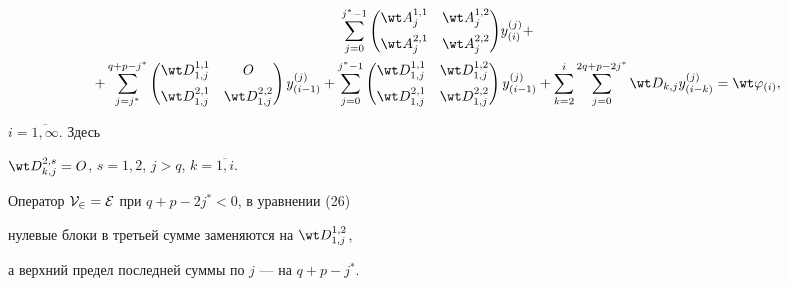\begin{pf}
\begin{gather}
\sum_{j=0}^{j^*-1}{


{\begin{pmatrix}


 \wt A_j^{1,1} & \wt A_j^{1,2} \\[2mm]


 \wt A_j^{2,1} & \wt A_j^{2,2} 


\end{pmatrix} }


y_{(i)}^{(j)}}+ \notag \\


%


+ \sum_{j=j^*}^{q+p-j^*}{


\begin{pmatrix}


 \wt D_{1,j}^{1,1} & O \\[2mm]


 \wt D_{1,j}^{2,1} & \wt D_{1,j}^{2,2}


\end{pmatrix}


y_{(i-1)}^{(j)}}+


 \sum_{j=0}^{j^*-1}{


\begin{pmatrix}


 \wt D_{1,j}^{1,1} & \wt D_{1,j}^{1,2} \\[2mm]


 \wt D_{1,j}^{2,1} & \wt D_{1,j}^{2,2}


\end{pmatrix}


y_{(i-1)}^{(j)}}+


\sum_{k=2}^{i}{


\sum_{j=0}^{2q+p-2j^*}{


\wt D_{k,j}


y_{(i-k)}^{(j)}}}=\wt \varphi_{(i)}, 


\end{gather}


$i=\overline{1, \infty }$. Здесь


$\wt D_{k,j}^{2,s}=O$, $s=1,2$, $j>q$, $k= \overline {1,i}$.





Оператор $\cal V_2=\cal E $ при $q+p-2j^* < 0$, в уравнении (26)


нулевые блоки в третьей сумме заменяются на $\wt D_{1,j}^{1,2}$,


а верхний предел последней суммы по $j$ --- на $q+p-j^*$.






\end{pf}
